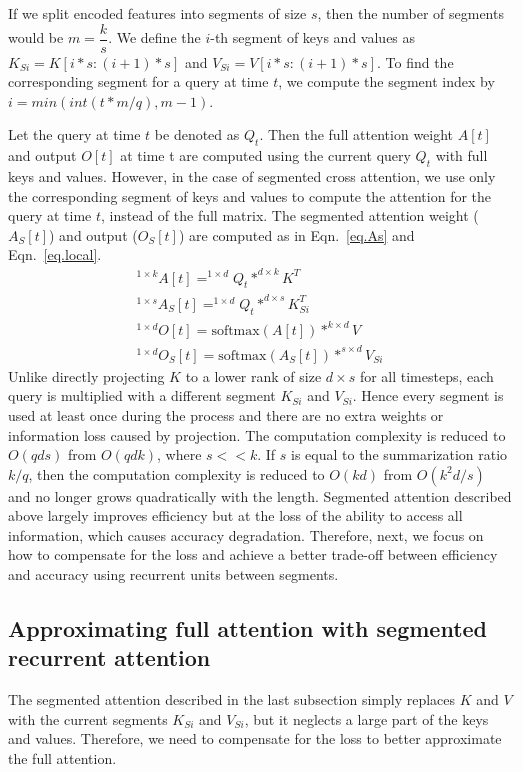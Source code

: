 \documentclass[11pt]{article}
\begin{document}
If we split encoded features into segments of size $s$, then the number of segments would be $m= \dfrac{k}{s}$.  We define the $i$-th segment of keys and values as $K_{Si} = K[i*s : (i+1)*s]$ and  $V_{Si} = V[i*s : (i+1)*s]$. To find the corresponding segment for a query at time $t$, we compute the segment index by $i = min(int(t * m / q), m-1)$.

Let the query at time $t$ be denoted as $Q_t$. Then the full attention weight $A[t]$ and output $O[t]$ at time t are computed using the current query $Q_t$ with full keys and values. However, in the case of segmented cross attention, we use only the corresponding segment of keys and values to compute the attention for the query at time $t$, instead of the full matrix. The segmented attention weight ($A_S[t]$) and output ($O_S[t]$) are computed as in Eqn.~\ref{eq.As} and Eqn.~\ref{eq.local}.
\begin{align}
^{1\times k}A[t] = ^{1\times d} Q_t * ^{d\times k}K^T \\ \label{eq.As}
^{1\times s}A_{S} [t] = ^{1\times d} Q_t * ^{d\times s}K_{Si}^T \\
^{1\times d}O[t] =  \text{softmax}( A[t] ) * ^{k\times d} V \\ \label{eq.local}
^{1\times d}O_{S} [t] =  \text{softmax}( A_S[t] ) * ^{s\times d} V_{Si}
\end{align}
Unlike directly projecting $K$ to a lower rank of size $d\times s$ for all timesteps, each query is multiplied with a different segment $K_{Si}$ and $V_{Si}$. Hence every segment is used at least once during the process and there are no extra weights or information loss caused by projection. The computation complexity is reduced to $O(qds)$ from $O(qdk)$, where $s<<k$. If $s$ is equal to the summarization ratio $k/q$, then the computation complexity is reduced to $O(kd)$ from $O(k^2d/s)$ and no longer grows quadratically with the length. Segmented attention described above largely improves efficiency but at the loss of the ability to access all information, which causes accuracy degradation. Therefore, next, we focus on how to compensate for the loss and achieve a better trade-off between efficiency and accuracy using recurrent units between segments. 


\subsection{Approximating full attention with segmented recurrent attention}
The segmented attention described in the last subsection simply replaces $K$ and $V$ with the current segments $K_{Si}$ and $V_{Si}$, but it neglects a large part of the keys and values. Therefore, we need to compensate for the loss to better approximate the full attention. 
\end{document}
